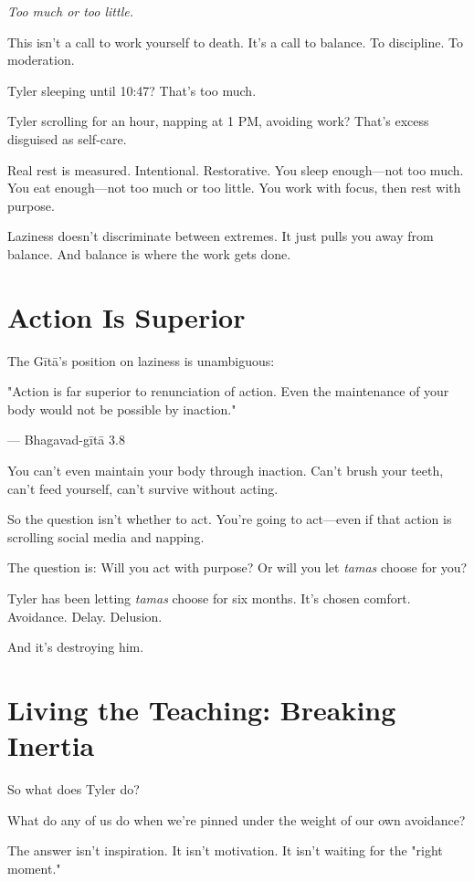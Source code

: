 \documentclass[11pt,twoside]{book}
\begin{document}
\textit{Too much or too little.}

This isn't a call to work yourself to death. It's a call to balance. To discipline. To moderation.

Tyler sleeping until 10:47? That's too much.

Tyler scrolling for an hour, napping at 1 PM, avoiding work? That's excess disguised as self-care.

Real rest is measured. Intentional. Restorative. You sleep enough—not too much. You eat enough—not too much or too little. You work with focus, then rest with purpose.

Laziness doesn't discriminate between extremes. It just pulls you away from balance. And balance is where the work gets done.

\section*{Action Is Superior}

The Gītā's position on laziness is unambiguous:

\begin{pullquote}
"Action is far superior to renunciation of action. Even the maintenance of your body would not be possible by inaction."

--- Bhagavad-gītā 3.8
\end{pullquote}

You can't even maintain your body through inaction. Can't brush your teeth, can't feed yourself, can't survive without acting.

So the question isn't whether to act. You're going to act—even if that action is scrolling social media and napping.

The question is: Will you act with purpose? Or will you let \textit{tamas} choose for you?

Tyler has been letting \textit{tamas} choose for six months. It's chosen comfort. Avoidance. Delay. Delusion.

And it's destroying him.

\section*{Living the Teaching: Breaking Inertia}

So what does Tyler do?

What do any of us do when we're pinned under the weight of our own avoidance?

The answer isn't inspiration. It isn't motivation. It isn't waiting for the "right moment."
\end{document}
